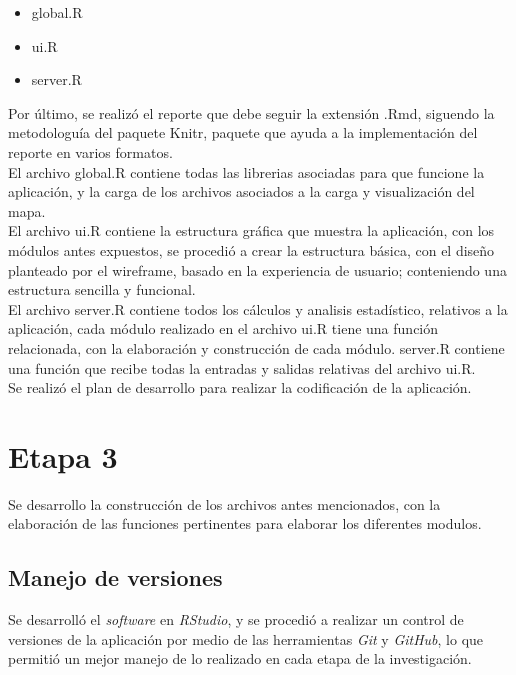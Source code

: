 \begin{itemize}
\item global.R
\item ui.R
\item server.R
\end{itemize}

Por \'ultimo, se realiz\'o el reporte que debe seguir la extensi\'on .Rmd, siguendo la metodologu\'ia del paquete Knitr, paquete que ayuda a la implementaci\'on del reporte en varios formatos. \\

El archivo global.R contiene todas las librerias asociadas para que funcione la aplicaci\'on, y la carga de los archivos asociados a la carga y visualizaci\'on del mapa.\\

El archivo ui.R contiene la estructura gr\'afica que muestra la aplicaci\'on, con los m\'odulos antes expuestos, se procedi\'o a crear la estructura b\'asica, con el diseño planteado por el wireframe, basado en la experiencia de usuario; conteniendo una estructura sencilla y funcional.\\

El archivo server.R contiene todos los c\'alculos y analisis estad\'istico, relativos a la aplicaci\'on, cada m\'odulo realizado en el archivo ui.R tiene una funci\'on relacionada, con la elaboraci\'on y construcci\'on de cada m\'odulo. server.R contiene una funci\'on que recibe todas la entradas y salidas relativas del archivo ui.R. \\

Se realiz\'o el plan de desarrollo para realizar la codificaci\'on de la aplicaci\'on.   

\section{Etapa 3}

Se desarrollo la construcci\'on de los archivos antes mencionados, con la elaboraci\'on de las funciones pertinentes para elaborar los diferentes modulos.

\subsection{Manejo de versiones}
Se desarroll\'o el  \textit{software} en \textit{RStudio}, y se procedi\'o a realizar un control de versiones de la aplicaci\'on por medio de las herramientas  \textit{Git} y  \textit{GitHub}, lo que permiti\'o un mejor manejo de lo realizado en cada etapa de la investigaci\'on.


